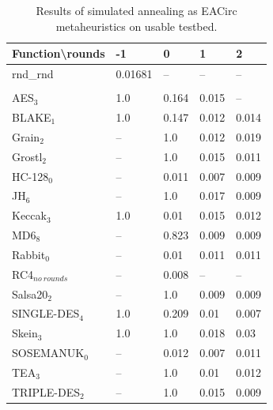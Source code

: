 \documentclass[
  print, %
  Table,   %
  nolof,     %
  nolot,     %
  11pt, %
  oneside  %
]{fithesis3}
\newcommand{\fd}{\cellcolor{red!13}}
\newcommand{\fn}{\cellcolor{green!13}}
\begin{document}
\begin{table}[H]
\centering
\begin{tabular}{l|l l l l}
Function\textbackslash{}rounds & -1 & 0 & 1 & 2\\ \hline
rnd\_rnd         & \fn{}0.01681 & --       & --         & --        \\\\
AES$_{3}$        & \fd{}1.0   & \fd{}0.164 & \fn{}0.015 & \fn{}--   \\
BLAKE$_{1}$      & \fd{}1.0   & \fd{}0.147 & \fn{}0.012 & \fn{}0.014\\
Grain$_{2}$      & \fd{}--    & \fd{}1.0   & \fn{}0.012 & \fn{}0.019\\
Grostl$_{2}$     & \fd{}--    & \fd{}1.0   & \fn{}0.015 & \fn{}0.011\\
HC-128$_{0}$     & \fd{}--    & \fn{}0.011 & \fn{}0.007 & \fn{}0.009\\
JH$_{6}$         & \fd{}--    & \fd{}1.0   & \fn{}0.017 & \fn{}0.009\\
Keccak$_{3}$     & \fd{}1.0   & \fn{}0.01  & \fn{}0.015 & \fn{}0.012\\
MD6$_{8}$        & \fd{}--    & \fd{}0.823 & \fn{}0.009 & \fn{}0.009\\
Rabbit$_{0}$     & \fd{}--    & \fn{}0.01  & \fn{}0.011 & \fn{}0.011\\
RC4$_{no~rounds}$& --         & \fn{}0.008 & --         & --        \\
Salsa20$_{2}$    & \fd{}--    & \fd{}1.0   & \fn{}0.009 & \fn{}0.009\\
SINGLE-DES$_{4}$ & \fd{}1.0   & \fd{}0.209 & \fn{}0.01  & \fn{}0.007\\
Skein$_{3}$      & \fd{}1.0   & \fd{}1.0   & \fn{}0.018 & \fn{}0.03 \\
SOSEMANUK$_{0}$  & \fd{}--    & \fn{}0.012 & \fn{}0.007 & \fn{}0.011\\
TEA$_{3}$        & \fd{}--    & \fd{}1.0   & \fn{}0.01  & \fn{}0.012\\
TRIPLE-DES$_{2}$ & \fd{}--    & \fd{}1.0   & \fn{}0.015 & \fn{}0.009
\end{tabular}
\caption{Results of simulated annealing as EACirc metaheuristics on usable testbed.}
\label{table:res-usable-sa}
\end{table}
\end{document}

